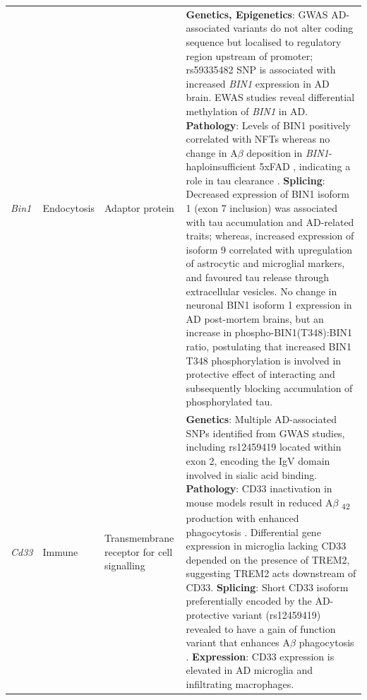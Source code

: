 \begin{landscape}
\begin{longtable}[c]{p{1cm}p{2cm}p{4cm}p{19cm}}
			\centering \textit{Bin1} &
			\centering Endocytosis  &
			\centering Adaptor protein &
			\tabitem \textbf{Genetics, Epigenetics}: GWAS AD-associated variants do not alter coding sequence but localised to regulatory region upstream of promoter; rs59335482 SNP is associated with increased \textit{BIN1} expression in AD brain\cite{Chapuis2013}. \newline
			\tabitem EWAS studies reveal differential methylation of \textit{BIN1} in AD.  \newline
			\tabitem \textbf{Pathology}: Levels of BIN1 positively correlated with NFTs whereas no change in A$\beta$ deposition in \textit{BIN1}-haploinsufficient 5xFAD \cite{Andrew2019}, indicating a role in tau clearance \cite{Crotti2019}.\newline 
			\tabitem \textbf{Splicing}: Decreased expression of BIN1 isoform 1 (exon 7 inclusion) was associated with tau accumulation and AD-related traits\cite{Taga2020}; whereas, increased expression of isoform 9 correlated with upregulation of astrocytic and microglial markers\cite{Taga2020}, and favoured tau release through extracellular vesicles\cite{Crotti2019}. \newline
			\tabitem No change in neuronal BIN1 isoform 1 expression in AD post-mortem brains, but an increase in phospho-BIN1(T348):BIN1 ratio, postulating that increased BIN1 T348 phosphorylation is involved in protective effect of interacting and subsequently blocking accumulation of phosphorylated tau\cite{Sartori2019}. \\
			\hdashline[0.5pt/5pt]
			
			\centering \textit{Cd33} &
			\centering Immune  &
			\centering Transmembrane receptor for cell signalling &
			\tabitem \textbf{Genetics}: Multiple AD-associated SNPs identified from GWAS studies, including  rs12459419\cite{Naj2011,Hollingworth2011,Bertram2008} located within exon 2, encoding the IgV domain involved in sialic acid binding\cite{Malik2013}. \newline
			\tabitem \textbf{Pathology}: CD33 inactivation in mouse models result in reduced A$\beta$ \textsubscript{42} production with enhanced phagocytosis \cite{Griciuc2013}. Differential gene expression in microglia lacking CD33 depended on the presence of TREM2, suggesting TREM2 acts downstream of CD33\cite{Griciuc2019}. \newline			
			\tabitem \textbf{Splicing}: Short CD33 isoform preferentially encoded by the AD-protective variant (rs12459419) revealed to have a gain of function variant that enhances A$\beta$ phagocytosis \cite{Bhattacherjee2021}.\newline		
			\tabitem \textbf{Expression}: CD33 expression is elevated in AD microglia and infiltrating macrophages\cite{Griciuc2013}. \\
			

\end{longtable}
\end{landscape}
